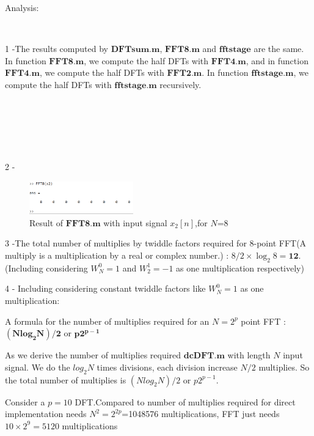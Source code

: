 \documentclass[journal]{IEEEtran}
\begin{document}
 \textcolor[rgb]{0,0.6,1}{Analysis:}

   $~$

\textcolor[rgb]{0,0.6,1}{1 -}The results computed by $\mathbf{DFTsum.m}$, $\mathbf{FFT8.m}$ and $\mathbf{fftstage}$ are the same. 
In function $\mathbf{FFT8.m}$, we compute the half DFTs with $\mathbf{FFT4.m}$, and in function $\mathbf{FFT4.m}$, we compute the half DFTs with $\mathbf{FFT2.m}$.
In function $\mathbf{fftstage.m}$, we compute the half DFTs with $\mathbf{fftstage.m}$ recursively. 

$~$

$~$

$~$

\textcolor[rgb]{0,0.6,1}{2 -}

\begin{figure}[H]
   \centering
   \includegraphics[width=0.4\textwidth]{5324.png} %
\caption{Result of $\mathbf{FFT8.m}$ with input signal $x_2[n]$,for $N$=8}
   \label{fig:10}
 \end{figure}

 \textcolor[rgb]{0,0.6,1}{3 -}The total number of multiplies by twiddle factors required for 8-point FFT(A multiply is a multiplication by a real or complex number.) :
 $8/2\times\log_2 8=$$\mathbf{12}$.(Including considering $W_N^0=1$ and $W_2^{1}=-1$ as one multiplication respectively)

 \textcolor[rgb]{0,0.6,1}{4 -}
Including considering constant twiddle factors like $W_N^0=1$ as one multiplication:

A formula for the number of multiplies required for an $N = 2^p$ point FFT : $\mathbf{(Nlog_{2}N)/2}$ or $\mathbf{p2^{p-1}}$

As we derive the number of multiplies required $\mathbf{dcDFT.m}$ with length $N$ input signal.
We do the $\displaystyle log_{2} N$ times divisions, each division increase $N/2$ multiplies. So the total number of multiplies is $(Nlog_{2}N)/2$ or $p2^{p-1}$.


Consider a $p=10$ DFT.Compared to number of multiplies required for direct implementation needs $N^2=2^{2p}$=1048576 multiplications,  FFT just needs $10\times 2^9=5120$ multiplications 
\end{document}
